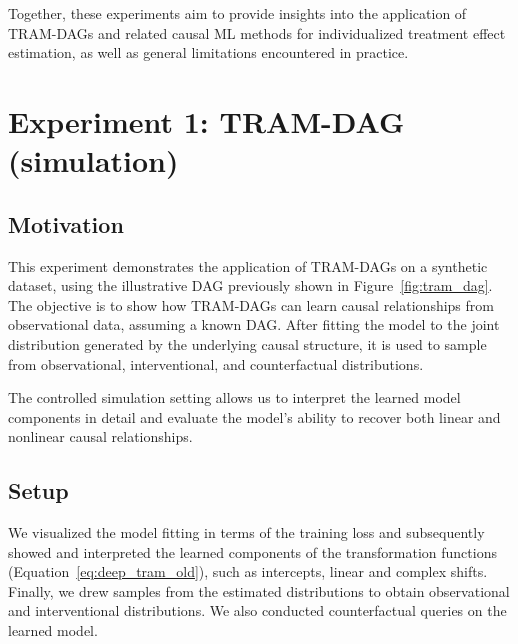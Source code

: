 Together, these experiments aim to provide insights into the application of TRAM-DAGs and related causal ML methods for individualized treatment effect estimation, as well as general limitations encountered in practice.




\section{Experiment 1: TRAM-DAG (simulation)} \label{ch:exp1}




\subsection{Motivation}

This experiment demonstrates the application of TRAM-DAGs on a synthetic dataset, using the illustrative DAG previously shown in Figure~\ref{fig:tram_dag}. The objective is to show how TRAM-DAGs can learn causal relationships from observational data, assuming a known DAG. After fitting the model to the joint distribution generated by the underlying causal structure, it is used to sample from observational, interventional, and counterfactual distributions.

The controlled simulation setting allows us to interpret the learned model components in detail and evaluate the model’s ability to recover both linear and nonlinear causal relationships.






\subsection{Setup} \label{sec:methods_experiment1}

We visualized the model fitting in terms of the training loss and subsequently showed and interpreted the learned components of the transformation functions (Equation~\ref{eq:deep_tram_old}), such as intercepts, linear and complex shifts. Finally, we drew samples from the estimated distributions to obtain observational and interventional distributions. We also conducted counterfactual queries on the learned model.

